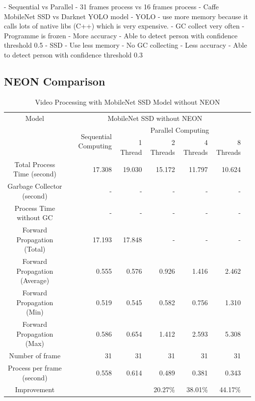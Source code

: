             - Sequential vs Parallel
            -	31 frames process vs 16 frames process
            -	Caffe MobileNet SSD vs Darknet YOLO model
                - YOLO
                    - use more memory because it calls lots of native libs (C++) which is very expensive.
                        - GC collect very often
                        - Programme is frozen
                    - More accuracy
                        - Able to detect person with confidence threshold 0.5
                - SSD
                    - Use less memory
                        - No GC collecting
                    - Less accuracy
                        - Able to detect person with confidence threshold 0.3

        \subsection{NEON Comparison}
        \begin{table}[!htp]\centering
            \scriptsize
            \begin{tabular}{lrrrrrrr}\toprule
                \multicolumn{2}{c}{Model} &\multicolumn{5}{c}{MobileNet SSD without NEON} \\\cmidrule{1-7}
                \multicolumn{2}{c}{\multirow{2}{*}{}} &\multirow{2}{*}{Sequential Computing} &\multicolumn{4}{c}{Parallel Computing} \\\cmidrule{4-7}
                & & &1 Thread &2 Threads &4 Threads &8 Threads \\\midrule
                \multicolumn{2}{c}{Total Process Time (second)} &17.308 &19.030 &15.172 &11.797 &10.624 \\
                \multicolumn{2}{c}{Garbage Collector (second)} &- &- &- &- &- \\
                \multicolumn{2}{c}{Process Time without GC} &- &- &- &- &- \\
                \multicolumn{2}{c}{Forward Propagation (Total)} &17.193 &17.848 &- &- &- \\
                \multicolumn{2}{c}{Forward Propagation (Average)} &0.555 &0.576 &0.926 &1.416 &2.462 \\
                \multicolumn{2}{c}{Forward Propagation (Min)} &0.519 &0.545 &0.582 &0.756 &1.310 \\
                \multicolumn{2}{c}{Forward Propagation (Max)} &0.586 &0.654 &1.412 &2.593 &5.308 \\
                \multicolumn{2}{c}{Number of frame} &31 &31 &31 &31 &31 \\
                \multicolumn{2}{c}{Process per frame (second)} &0.558 &0.614 &0.489 &0.381 &0.343 \\
                \multicolumn{2}{c}{Improvement} & & &20.27\% &38.01\% &44.17\% \\
                \bottomrule
            \end{tabular}

            \caption{Video Processing with MobileNet SSD Model without NEON}\label{ssd:non-neon-performance}
        \end{table}

